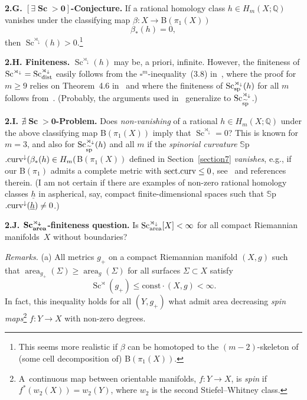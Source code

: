 \documentclass[pdftex]{sigma}
\numberwithin{equation}{section}
\begin{document}
 \textbf {2.G. $\boldsymbol{[\exists \operatorname{Sc}>0]}$-Conjecture.} If a rational homology class $h\in H_m(X;\mathbb Q)$ vanishes under the
 classifying map $ \beta\colon X\to ${\sf B}$(\pi_1(X))$
\[
\beta_\ast (h)=0,
\]
 then $\operatorname{Sc}^{\rtimes_\downarrow}(h) >0$.\footnote{This seems more realistic if $\beta$ can be
homotoped to the $(m-2)$-skeleton of (some cell decomposition of) $ ${\sf B}$(\pi_1(X))$.}

\textbf {2.H. Finiteness.} $ \operatorname{Sc}^{\rtimes_\downarrow}(h)$ may be, a priori, infinite. However, the finiteness of $\operatorname{Sc}^{\rtimes_\downarrow}=\operatorname{Sc}^{\rtimes_\downarrow}_{\rm dist}$ easily follows from
 the $\square^m$-inequality~(3.8) in~\cite{Gr2021}, where the
 proof for $m\geq 9$ relies on Theorem~4.6 in~\cite{SY2017} and
 where the finiteness of $ \operatorname{Sc}_{\rm sp} ^{\rtimes_\downarrow}(h)$
 for all $m$ follows from~\cite{WXY2021}.
 (Probably, the arguments used in~\cite{WXY2021} generalize to $ \operatorname{Sc}_{\widetilde{\rm sp}} ^{\rtimes_\downarrow}$.)

 \textbf{2.I. $\boldsymbol{\nexists \operatorname{Sc}>0}$-Problem.}
 Does {\it non-vanishing} of a rational $h\in H_m(X;\mathbb Q)$ under the above classifying map {\sf B}$ (\pi_1(X))$
 imply that
$\operatorname{Sc} ^{\rtimes_\downarrow}=0$?
 This is known for $m=3$, and also for
 $\operatorname{Sc} ^{\rtimes_\downarrow}_{\widetilde{\rm sp}}(h)$ and all $m$ if the {\it spinorial curvature} $\mathbb S${\sf p}$.{\rm curv}^\downarrow(\beta_\ast(h)\in H_m(${\sf B}$(\pi_1(X))$
 defined in Section~\ref{section7} {\it vanishes}, e.g., if our {\sf B}$(\pi_1)$ admits a complete metric with ${\rm sect.curv}\leq 0$, see~\cite{Gr2021} and references therein.
 (I am not certain if there are examples of non-zero rational homology classes $\underline h$ in aspherical, say, compact finite-dimensional spaces such that $\mathbb S${\sf p}$.{\rm curv}^\downarrow(\underline h)\neq 0$.)

 \textbf {2.J. $\boldsymbol{\operatorname{Sc}_{\rm area}^{\rtimes_\downarrow}}$-finiteness question.} Is
$\operatorname{Sc}_{\rm area}^{\rtimes_\downarrow}[X]<\infty$
 for all compact Riemannian manifolds~$X$ without boundaries?

{\it Remarks.} (a) All metrics $g_+$ on a compact Riemannian
 manifold $(X,g)$ such that $\operatorname{area}_{g_+}(\Sigma) \geq \operatorname{area}_{g}(\Sigma)$ for all surfaces $\Sigma \subset X$ satisfy
\[
\operatorname{Sc}^\rtimes (g_+)\leq \mathrm{const}\cdot (X,g)<\infty.
\]
 In fact, this inequality holds for all $(Y, g_+)$ what admit area decreasing {\it spin maps}\footnote{A~continuous map between orientable manifolds, $f\colon Y\to X$, is \emph{spin} if $f^\ast(w_2(X))=w_2(Y)$, where $w_2$ is the second Stiefel--Whitney class.}
 $f\colon Y\to X$ with non-zero degrees.
\end{document}
